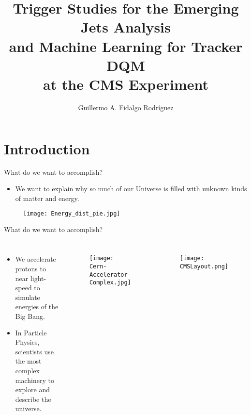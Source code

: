 \documentclass[8pt,aspectratio=169]{beamer}
\title[EMJ and ML4TkDQM]{Trigger Studies for the Emerging Jets Analysis \\and Machine Learning for Tracker DQM \\at the CMS Experiment}
\author[GAFR]{Guillermo A. Fidalgo Rodríguez}
\institute[UPRM]{University of Puerto Rico - Mayagüez}
\begin{document}
\maketitle

\begin{frame}
	\Large
	\tableofcontents
\end{frame}

\section{Introduction}
\begin{frame}{What do we want to accomplish?}
	\begin{itemize}
		\item We want to explain why so much of our Universe is filled with unknown kinds of matter and energy.
	\end{itemize}
	\begin{figure}
		\centering
		\texttt{[image: Energy\_dist\_pie.jpg]}
	\end{figure}
\end{frame}
\begin{frame}{What do we want to accomplish?}
	\begin{columns}
		\begin{itemize}
			\item We accelerate protons to near light-speed to simulate energies of the Big Bang.
			\item In Particle Physics, scientists use the most complex machinery to explore and describe the universe.
		\end{itemize}
		\begin{figure}
			\centering
			\texttt{[image: Cern-Accelerator-Complex.jpg]}
		\end{figure}
		\begin{figure}
			\centering
			\texttt{[image: CMSLayout.png]}
		\end{figure}
	\end{columns}
\end{frame}
\end{document}

